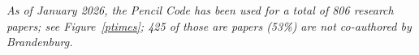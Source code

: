 \documentclass[12pt]{article}
\begin{document}
{\em
As of January 2026, the {\sc Pencil Code} has been used for a total of
806 research papers; see Figure~\ref{ptimes};
425 of those are papers (53\%) are not co-authored by Brandenburg. %
}
\end{document}
